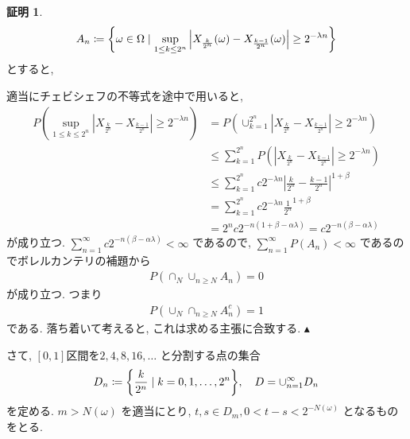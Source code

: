 \documentclass[10pt, fleqn, label-section=none]{bxjsarticle}
\theoremstyle{definition}
\newtheorem*{pf*}{証明}
\newcommand{\cbra}[1]{\mleft\{#1\mright\}}
\newcommand{\abs}[1]{\left|#1\right|}
\newcommand{\naraba}{\Rightarrow}
\renewcommand{\;}{\, ; \,}
\newenvironment{claim}[1]{\par\noindent\underline{step:}\space#1}{}
\newenvironment{claimproof}[1]{\par\noindent{($\because$)}\space#1}{\hfill $\blacktriangle $}
\begin{document}
\begin{pf*} 

 \begin{align*} A_n \coloneqq \cbra{\omega \in \Omega \mid \sup_{1 \leq k \leq 2^n}  \abs{X_{\frac{k}{2^n}} (\omega)  - X_{\frac{k-1}{2^n}} (\omega)   }  \geq 2^{-\lambda n} }  \end{align*}
 とすると, 
 
\begin{claimproof}
適当にチェビシェフの不等式を途中で用いると, 
\begin{align*} P(\sup_{1 \leq k \leq 2^n}  \abs{X_{\frac{k}{2^n}}  - X_{\frac{k-1}{2^n}} }  \geq 2^{-\lambda n}      ) &= P( \cup_{k=1}^{2^n} \abs{X_{\frac{k}{2^n}}  - X_{\frac{k-1}{2^n}} }  \geq 2^{-\lambda n}      )  \\
&\leq  \sum_{k=1} ^ {2^n} P( \abs{X_{\frac{k}{2^n}}  - X_{\frac{k-1}{2^n}} }  \geq 2^{-\lambda n}      ) \\
&\leq \sum_{k=1} ^ {2^n} c 2^{-\lambda n } \abs{   \frac{k}{2^n}  -  \frac{k-1}{2^n}   }^{1 + \beta} \\
&= \sum_{k=1} ^ {2^n} c 2^{-\lambda n } \frac{1}{2^n} ^{1 + \beta} \\
&= 2^n c 2 ^ {-n(1 + \beta - \alpha \lambda)} = c 2^{-n(\beta - \alpha \lambda)}
 \end{align*}
 が成り立つ. 
$\sum_{n=1} ^{\infty} c 2^{-n(\beta - \alpha \lambda)}   < \infty$ であるので, $\sum_{n=1}^\infty P(A_n) < \infty$ であるのでボレルカンテリの補題から
 \begin{align*} P(\cap_{N} \cup_{n \geq N} A_n ) = 0\end{align*} 
 が成り立つ. つまり
  \begin{align*} P(\cup_{N} \cap_{n \geq N} A_n ^c ) = 1\end{align*} 
  である. 落ち着いて考えると, これは求める主張に合致する. 
\end{claimproof}

 さて, $[0,1]$区間を$2, 4, 8, 16, \ldots $ と分割する点の集合
 \begin{align*} D_n \coloneqq \cbra{\frac{k}{2^n} \mid k = 0, 1, \ldots , 2^n  } ,\quad  D = \cup_{n=1}^\infty  D_n \end{align*}
 を定める. $m > N(\omega)$ を適当にとり,  $t,s \in D_m, 0 < t-s < 2^{-N(\omega)}$ となるものをとる.


\end{pf*}
\end{document}
